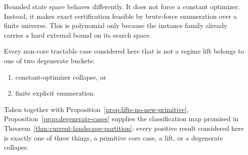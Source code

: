 Bounded state space behaves differently. It does not force a constant optimizer. Instead, it makes exact certification feasible by brute-force enumeration over a finite universe. This is polynomial only because the instance family already carries a hard external bound on its search space.

\begin{proposition}\label{prop:degenerate-cases}
Every non-core tractable case considered here that is not a regime lift belongs to one of two degenerate buckets:
\begin{enumerate}
\item constant-optimizer collapse, or
\item finite explicit enumeration.
\end{enumerate}
\end{proposition}

Taken together with Proposition~\ref{prop:lifts-no-new-primitive}, Proposition~\ref{prop:degenerate-cases} supplies the classification map promised in Theorem~\ref{thm:current-landscape-partition}: every positive result considered here is exactly one of three things, a primitive core case, a lift, or a degenerate collapse.
